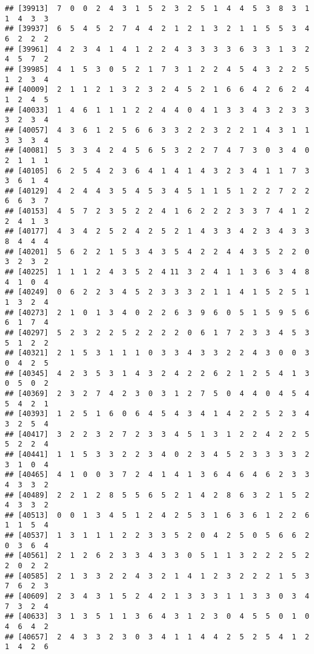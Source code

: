 \documentclass[
]{article}
\begin{document}
\begin{verbatim}
## [39913]  7  0  0  2  4  3  1  5  2  3  2  5  1  4  4  5  3  8  3  1  1  4  3  3
## [39937]  6  5  4  5  2  7  4  4  2  1  2  1  3  2  1  1  5  5  3  4  6  2  2  2
## [39961]  4  2  3  4  1  4  1  2  2  4  3  3  3  3  6  3  3  1  3  2  4  5  7  2
## [39985]  4  1  5  3  0  5  2  1  7  3  1  2  2  4  5  4  3  2  2  5  1  2  3  4
## [40009]  2  1  1  2  1  3  2  3  2  4  5  2  1  6  6  4  2  6  2  4  1  2  4  5
## [40033]  1  4  6  1  1  1  2  2  4  4  0  4  1  3  3  4  3  2  3  3  3  2  3  4
## [40057]  4  3  6  1  2  5  6  6  3  3  2  2  3  2  2  1  4  3  1  1  3  3  3  4
## [40081]  5  3  3  4  2  4  5  6  5  3  2  2  7  4  7  3  0  3  4  0  2  1  1  1
## [40105]  6  2  5  4  2  3  6  4  1  4  1  4  3  2  3  4  1  1  7  3  3  6  1  4
## [40129]  4  2  4  4  3  5  4  5  3  4  5  1  1  5  1  2  2  7  2  2  6  6  3  7
## [40153]  4  5  7  2  3  5  2  2  4  1  6  2  2  2  3  3  7  4  1  2  2  4  1  3
## [40177]  4  3  4  2  5  2  4  2  5  2  1  4  3  3  4  2  3  4  3  3  8  4  4  4
## [40201]  5  6  2  2  1  5  3  4  3  5  4  2  2  4  4  3  5  2  2  0  3  2  3  2
## [40225]  1  1  1  2  4  3  5  2  4 11  3  2  4  1  1  3  6  3  4  8  4  1  0  4
## [40249]  0  6  2  2  3  4  5  2  3  3  3  2  1  1  4  1  5  2  5  1  1  3  2  4
## [40273]  2  1  0  1  3  4  0  2  2  6  3  9  6  0  5  1  5  9  5  6  6  1  7  4
## [40297]  5  2  3  2  2  5  2  2  2  2  0  6  1  7  2  3  3  4  5  3  5  1  2  2
## [40321]  2  1  5  3  1  1  1  0  3  3  4  3  3  2  2  4  3  0  0  3  0  4  2  5
## [40345]  4  2  3  5  3  1  4  3  2  4  2  2  6  2  1  2  5  4  1  3  0  5  0  2
## [40369]  2  3  2  7  4  2  3  0  3  1  2  7  5  0  4  4  0  4  5  4  5  4  2  1
## [40393]  1  2  5  1  6  0  6  4  5  4  3  4  1  4  2  2  5  2  3  4  3  2  5  4
## [40417]  3  2  2  3  2  7  2  3  3  4  5  1  3  1  2  2  4  2  2  5  5  2  2  4
## [40441]  1  1  5  3  3  2  2  3  4  0  2  3  4  5  2  3  3  3  3  2  3  1  0  4
## [40465]  4  1  0  0  3  7  2  4  1  4  1  3  6  4  6  4  6  2  3  3  4  3  3  2
## [40489]  2  2  1  2  8  5  5  6  5  2  1  4  2  8  6  3  2  1  5  2  4  3  3  2
## [40513]  0  0  1  3  4  5  1  2  4  2  5  3  1  6  3  6  1  2  2  6  1  1  5  4
## [40537]  1  3  1  1  1  2  2  3  3  5  2  0  4  2  5  0  5  6  6  2  0  3  6  4
## [40561]  2  1  2  6  2  3  3  4  3  3  0  5  1  1  3  2  2  2  5  2  2  0  2  2
## [40585]  2  1  3  3  2  2  4  3  2  1  4  1  2  3  2  2  2  1  5  3  7  6  2  3
## [40609]  2  3  4  3  1  5  2  4  2  1  3  3  3  1  1  3  3  0  3  4  7  3  2  4
## [40633]  3  1  3  5  1  1  3  6  4  3  1  2  3  0  4  5  5  0  1  0  4  6  4  2
## [40657]  2  4  3  3  2  3  0  3  4  1  1  4  4  2  5  2  5  4  1  2  1  4  2  6

\end{verbatim}
\end{document}
